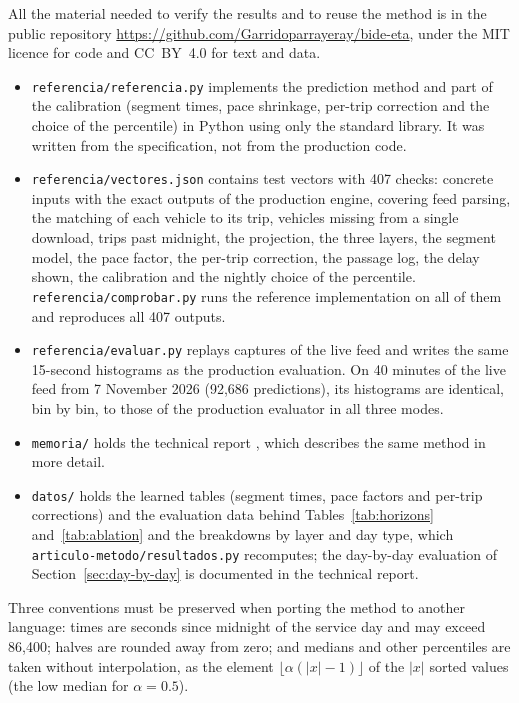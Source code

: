 \documentclass[preprint,11pt,nonatbib]{elsarticle}
\begin{document}
All the material needed to verify the results and to reuse the method is in the public repository
\url{https://github.com/Garridoparrayeray/bide-eta}, under the MIT licence for code and CC~BY~4.0 for text and data.

\begin{itemize}
  \item \texttt{referencia/referencia.py} implements the prediction method and part of the calibration (segment times,
        pace shrinkage, per-trip correction and the choice of the percentile) in Python using only the standard library. It was
        written from the specification, not from the production code.
  \item \texttt{referencia/vectores.json} contains test vectors with 407 checks: concrete inputs with the exact
        outputs of the production engine, covering feed parsing, the matching of each vehicle to its trip, vehicles
        missing from a single download, trips past midnight, the projection, the three layers, the segment model, the
        pace factor, the per-trip correction, the passage log, the delay shown, the calibration and the nightly choice
        of the percentile. \texttt{referencia/comprobar.py} runs the reference implementation on all of them and
        reproduces all 407 outputs.
  \item \texttt{referencia/evaluar.py} replays captures of the live feed and writes the same 15-second histograms as
        the production evaluation. On 40 minutes of the live feed from 7 November 2026 (92,686 predictions), its
        histograms are identical, bin by bin, to those of the production evaluator in all three modes.
  \item \texttt{memoria/} holds the technical report \parencite{garrido2026memoria}, which describes the same method
        in more detail.
  \item \texttt{datos/} holds the learned tables (segment times, pace factors and per-trip corrections) and the
        evaluation data behind Tables~\ref{tab:horizons} and~\ref{tab:ablation} and the breakdowns by layer and day type,
        which \texttt{articulo-metodo/resultados.py} recomputes; the day-by-day evaluation of
        Section~\ref{sec:day-by-day} is documented in the technical report.
\end{itemize}

\noindent Three conventions must be preserved when porting the method to another language: times are seconds since
midnight of the service day and may exceed 86,400; halves are rounded away from zero; and medians and other
percentiles are taken without interpolation, as the element $\lfloor\alpha(|x|-1)\rfloor$ of the $|x|$ sorted
values (the low median for $\alpha=0.5$).
\end{document}
